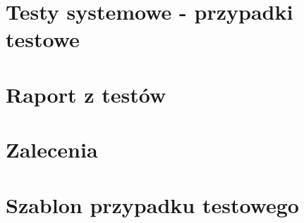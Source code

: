 \documentclass[a4paper,15pt]{article}
\begin{document}
\section{Testy systemowe - przypadki testowe}



\section{Raport z testów}

\section{Zalecenia}



\section{Szablon przypadku testowego}
\end{document}
